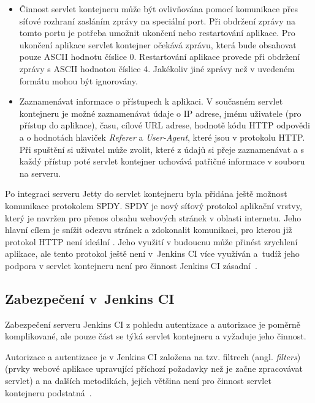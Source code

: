 \begin{itemize}
                \item Činnost servlet kontejneru může být ovlivňována pomocí komunikace přes síťové rozhraní zasláním zprávy
                    na speciální port. Při obdržení zprávy na tomto portu je potřeba umožnit ukončení nebo restartování aplikace.
                    Pro ukončení aplikace servlet kontejner očekává zprávu, která bude obsahovat pouze ASCII hodnotu číslice 0.
                    Restartování aplikace provede při obdržení zprávy s ASCII hodnotou číslice 4. Jakékoliv
                    jiné zprávy než v uvedeném formátu mohou být ignorovány.

                \item Zaznamenávat informace o přístupech k aplikaci. V současném servlet kontejneru je možné zaznamenávat
                    údaje o IP adrese, jménu uživatele (pro přístup do aplikace), času, cílové URL adrese, hodnotě 
                    kódu HTTP odpovědi a o hodnotách hlaviček \emph{Referer} a \emph{User-Agent}, které jsou v protokolu HTTP.
                    Při spuštění si uživatel může zvolit, které z údajů si přeje zaznamenávat a s každý přístup poté 
                    servlet kontejner uchovává patřičné informace v souboru na serveru.

            \end{itemize}
            

            Po integraci serveru Jetty do servlet kontejneru byla přidána ještě možnost
            komunikace protokolem SPDY. SPDY je nový síťový protokol aplikační vrstvy, který je
            navržen pro přenos obsahu webových stránek v oblasti internetu. Jeho hlavní cílem je snížit odezvu stránek a zdokonalit
            komunikaci, pro kterou již protokol HTTP není ideální \cite{spdyArticle}.
            Jeho využití v budoucnu může přinést zrychlení aplikace, ale 
            tento protokol ještě není 
            v~Jenkins CI více využíván a~tudíž jeho podpora v servlet kontejneru není pro činnost Jenkins CI zásadní~\cite{kohsukeTopic}.
        
        \subsection{Zabezpečení v~Jenkins CI} \label{secSecurityArchitecture}
            Zabezpečení serveru Jenkins CI z pohledu autentizace a autorizace je poměrně komplikované,
            ale pouze část se týká servlet kontejneru a vyžaduje jeho činnost. 
            
            Autorizace a autentizace je v Jenkins CI založena na tzv. filtrech (angl. \emph{filters})
            (prvky webové aplikace upravující příchozí požadavky než je začne zpracovávat servlet) 
            a na dalších metodikách, jejich většina není pro činnost servlet kontejneru podstatná~\cite{securityArchitectureJenkins}. 
            
